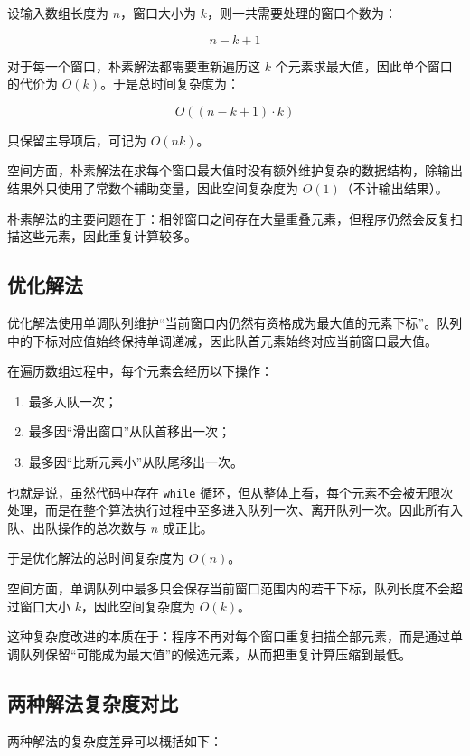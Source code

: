 \documentclass[a4paper,UTF8,fontset=none]{ctexart}
\begin{document}
设输入数组长度为 $n$，窗口大小为 $k$，则一共需要处理的窗口个数为：

\[
n-k+1
\]

对于每一个窗口，朴素解法都需要重新遍历这 $k$ 个元素求最大值，因此单个窗口的代价为 $O(k)$。于是总时间复杂度为：

\[
O((n-k+1)\cdot k)
\]

只保留主导项后，可记为 $O(nk)$。

空间方面，朴素解法在求每个窗口最大值时没有额外维护复杂的数据结构，除输出结果外只使用了常数个辅助变量，因此空间复杂度为 $O(1)$（不计输出结果）。

朴素解法的主要问题在于：相邻窗口之间存在大量重叠元素，但程序仍然会反复扫描这些元素，因此重复计算较多。

\subsection{优化解法}

优化解法使用单调队列维护“当前窗口内仍然有资格成为最大值的元素下标”。队列中的下标对应值始终保持单调递减，因此队首元素始终对应当前窗口最大值。

在遍历数组过程中，每个元素会经历以下操作：

\begin{enumerate}
    \item 最多入队一次；
    \item 最多因“滑出窗口”从队首移出一次；
    \item 最多因“比新元素小”从队尾移出一次。
\end{enumerate}

也就是说，虽然代码中存在 \texttt{while} 循环，但从整体上看，每个元素不会被无限次处理，而是在整个算法执行过程中至多进入队列一次、离开队列一次。因此所有入队、出队操作的总次数与 $n$ 成正比。

于是优化解法的总时间复杂度为 $O(n)$。

空间方面，单调队列中最多只会保存当前窗口范围内的若干下标，队列长度不会超过窗口大小 $k$，因此空间复杂度为 $O(k)$。

这种复杂度改进的本质在于：程序不再对每个窗口重复扫描全部元素，而是通过单调队列保留“可能成为最大值”的候选元素，从而把重复计算压缩到最低。

\subsection{两种解法复杂度对比}

两种解法的复杂度差异可以概括如下：
\end{document}
